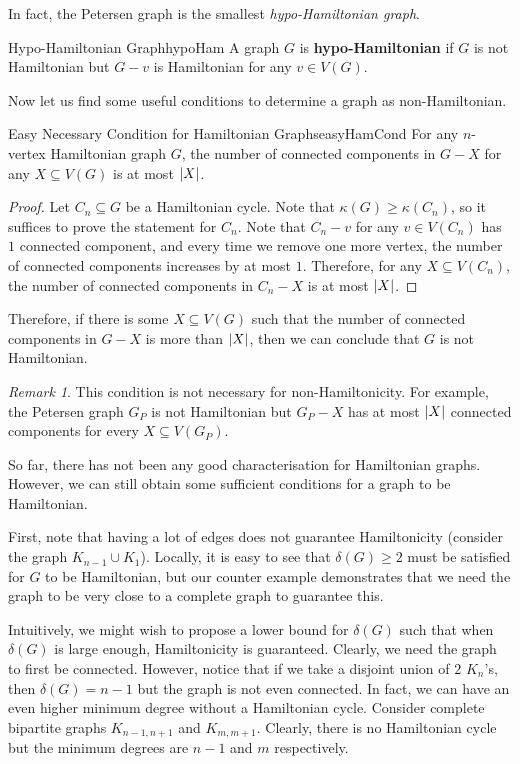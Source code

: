 \documentclass[math]{amznotes}
\theoremstyle{remark}
\newtheorem*{remark}{Remark}
\newcommand{\0}{\mathbf{0}}
\newcommand{\1}{\mathbf{1}}
\begin{document}
In fact, the Petersen graph is the smallest \textit{hypo-Hamiltonian graph}.
\begin{dfnbox}{Hypo-Hamiltonian Graph}{hypoHam}
    A graph $G$ is {\color{red} \textbf{hypo-Hamiltonian}} if $G$ is not Hamiltonian but $G - v$ is Hamiltonian for any $v \in V(G)$.
\end{dfnbox}
Now let us find some useful conditions to determine a graph as non-Hamiltonian. 
\begin{probox}{Easy Necessary Condition for Hamiltonian Graphs}{easyHamCond}
    For any $n$-vertex Hamiltonian graph $G$, the number of connected components in $G - X$ for any $X \subseteq V(G)$ is at most ${\left\lvert {X} \right\rvert}$.
    \tcblower
    \begin{proof}
        Let $C_n \subseteq G$ be a Hamiltonian cycle. Note that $\kappa(G) \geq \kappa(C_n)$, so it suffices to prove the statement for $C_n$. Note that $C_n - v$ for any $v \in V(C_n)$ has $1$ connected component, and every time we remove one more vertex, the number of connected components increases by at most $1$. Therefore, for any $X \subseteq V(C_n)$, the number of connected components in $C_n - X$ is at most ${\left\lvert {X} \right\rvert}$.
    \end{proof}
\end{probox}
Therefore, if there is some $X \subseteq V(G)$ such that the number of connected components in $G - X$ is more than ${\left\lvert {X} \right\rvert}$, then we can conclude that $G$ is not Hamiltonian. 
\begin{notebox}
    \begin{remark}
        This condition is not necessary for non-Hamiltonicity. For example, the Petersen graph $G_P$ is not Hamiltonian but $G_P - X$ has at most ${\left\lvert {X} \right\rvert}$ connected components for every $X \subseteq V(G_P)$.
    \end{remark}
\end{notebox}
So far, there has not been any good characterisation for Hamiltonian graphs. However, we can still obtain some sufficient conditions for a graph to be Hamiltonian.

First, note that having a lot of edges does not guarantee Hamiltonicity (consider the graph $K_{n - 1} \cup K_1$). Locally, it is easy to see that $\delta(G) \geq 2$ must be satisfied for $G$ to be Hamiltonian, but our counter example demonstrates that we need the graph to be very close to a complete graph to guarantee this.

Intuitively, we might wish to propose a lower bound for $\delta(G)$ such that when $\delta(G)$ is large enough, Hamiltonicity is guaranteed. Clearly, we need the graph to first be connected. However, notice that if we take a disjoint union of $2$ $K_n$'s, then $\delta(G) = n - 1$ but the graph is not even connected. In fact, we can have an even higher minimum degree without a Hamiltonian cycle. Consider complete bipartite graphs $K_{n - 1, n + 1}$ and $K_{m, m + 1}$. Clearly, there is no Hamiltonian cycle but the minimum degrees are $n - 1$ and $m$ respectively.
\end{document}
